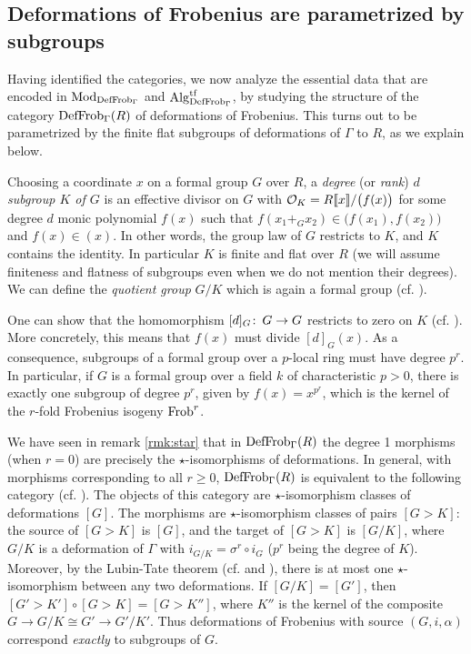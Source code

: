 \documentclass{gtpart}
\theoremstyle{definition}
\theoremstyle{remark}
\def\co{\colon\thinspace}
\newcommand{\Mod}{{\rm Mod}}
\newcommand{\Alg}{{\rm Alg}}
\newcommand{\Frob}{{\rm Frob}}
\newcommand{\CO}{{\cal O}}
\newcommand{\DF}{{{\rm DefFrob}_\Gamma}}
\begin{document}
\subsection{Deformations of Frobenius are parametrized by subgroups}
\label{subsec:subgp}

Having identified the categories, we now analyze the essential data that are 
encoded in $\Mod_\DF$ and $\Alg_\DF^{\rm tf}$, by studying the structure of 
the category $\DF(R)$ of deformations of Frobenius.  This turns out to be 
parametrized by the finite flat subgroups of deformations of $\Gamma$ to $R$, 
as we explain below.

Choosing a coordinate $x$ on a formal group $G$ over $R$, a {\em degree} (or 
{\em rank}) {\em $d$ subgroup $K$ of $G$} is an effective divisor on $G$ with 
$\CO_K = R \llbracket x \rrbracket / \big(f(x)\big)$ for some degree $d$ monic 
polynomial $f(x)$ such that $f(x_1 +_G x_2) \in \big(f(x_1),f(x_2)\big)$ and 
$f(x) \in (x)$.  In other words, the group law of $G$ restricts to $K$, and 
$K$ contains the identity.  In particular $K$ is finite and flat over $R$ (we 
will assume finiteness and flatness of subgroups even when we do not mention 
their degrees).  We can define the {\em quotient group} $G/K$ which is again a 
formal group (cf. \cite[section 5]{strick}).  

One can show that the homomorphism $[d]_G\co G \to G$ restricts to zero on $K$ 
(cf. \cite[section 1]{tateoort}).  More concretely, this means that $f(x)$ 
must divide $[d]_G(x)$.  As a consequence, subgroups of a formal group over a 
$p$-local ring must have degree $p^r$.  In particular, if $G$ is a formal 
group over a field $k$ of characteristic $p>0$, there is exactly one subgroup 
of degree $p^r$, given by $f(x) = x^{p^r}$, which is the kernel of the 
$r$-fold Frobenius isogeny $\Frob^r$.  

We have seen in remark \ref{rmk:star} that in $\DF(R)$ the degree 1 morphisms 
(when $r = 0$) are precisely the $\star$-isomorphisms of deformations.  In 
general, with morphisms corresponding to all $r \geq 0$, $\DF(R)$ is 
equivalent to the following category (cf. \cite[proposition 16.9]{lpo}).  The 
objects of this category are $\star$-isomorphism classes of deformations $[G]$.  
The morphisms are $\star$-isomorphism classes of pairs $[G > K]$: the source 
of $[G > K]$ is $[G]$, and the target of $[G > K]$ is $[G/K]$, where $G/K$ is 
a deformation of $\Gamma$ with $i_{G/K} = \sigma^r \circ i_G$ ($p^r$ being the 
degree of $K$).  Moreover, by the Lubin-Tate theorem (cf. 
\cite[theorem 3.1]{lubintate} and \cite[section 4.3]{H-Mthm}), there is at 
most one $\star$-isomorphism between any two deformations.  If $[G/K] = [G']$, 
then $[G' > K'] \circ [G > K] = [G > K'']$, where $K''$ is the kernel of the 
composite $G \to G/K \cong G' \to G'/K'$.  Thus deformations of Frobenius with 
source $(G,i,\alpha)$ correspond {\em exactly} to subgroups of $G$.  
\end{document}
